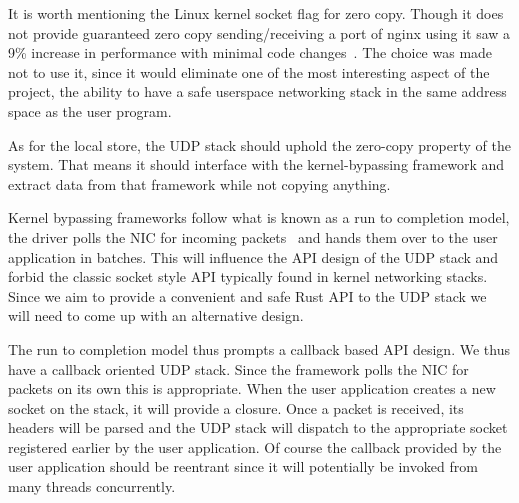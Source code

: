 It is worth mentioning the Linux kernel socket flag for zero copy.
Though it does not provide guaranteed zero copy sending/receiving a
port of nginx using it saw a 9\% increase in performance with minimal
code changes~\cite{linuxzc}. The choice was made not to use it, since
it would eliminate one of the most interesting aspect of the project,
the ability to have a safe userspace networking stack in the same
address space as the user program.

As for the local store, the UDP stack should uphold the zero-copy
property of the system. That means it should interface with the
kernel-bypassing framework and extract data from that framework while
not copying anything.

Kernel bypassing frameworks follow what is known as a run to
completion model, the driver polls the NIC for incoming
packets~\cite{dpdk-pmd} and hands them over to the user application in
batches. This will influence the API design of the UDP stack and
forbid the classic socket style API typically found in kernel
networking stacks. Since we aim to provide a convenient and safe Rust
API to the UDP stack we will need to come up with an alternative
design.

The run to completion model thus prompts a callback based API
design. We thus have a callback oriented UDP stack. Since the
framework polls the NIC for packets on its own this is
appropriate. When the user application creates a new socket on the
stack, it will provide a closure. Once a packet is received, its
headers will be parsed and the UDP stack will dispatch to the
appropriate socket registered earlier by the user application. Of
course the callback provided by the user application should be
reentrant since it will potentially be invoked from many threads
concurrently.


